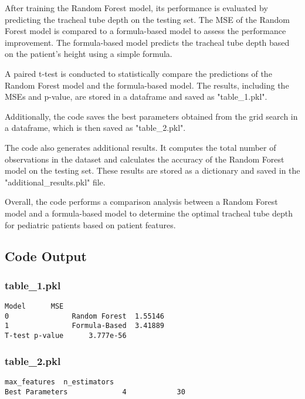 \documentclass[11pt]{article}
\begin{document}
After training the Random Forest model, its performance is evaluated by predicting the tracheal tube depth on the testing set. The MSE of the Random Forest model is compared to a formula-based model to assess the performance improvement. The formula-based model predicts the tracheal tube depth based on the patient's height using a simple formula.

A paired t-test is conducted to statistically compare the predictions of the Random Forest model and the formula-based model. The results, including the MSEs and p-value, are stored in a dataframe and saved as "table\_1.pkl".

Additionally, the code saves the best parameters obtained from the grid search in a dataframe, which is then saved as "table\_2.pkl".

The code also generates additional results. It computes the total number of observations in the dataset and calculates the accuracy of the Random Forest model on the testing set. These results are stored as a dictionary and saved in the "additional\_results.pkl" file.

Overall, the code performs a comparison analysis between a Random Forest model and a formula-based model to determine the optimal tracheal tube depth for pediatric patients based on patient features.

\subsection{Code Output}

\subsubsection*{table\_1.pkl}

\begin{Verbatim}[tabsize=4]
                        Model      MSE
0               Random Forest  1.55146
1               Formula-Based  3.41889
T-test p-value      3.777e-56
\end{Verbatim}

\subsubsection*{table\_2.pkl}

\begin{Verbatim}[tabsize=4]
                 max_features  n_estimators
Best Parameters             4            30
\end{Verbatim}
\end{document}
